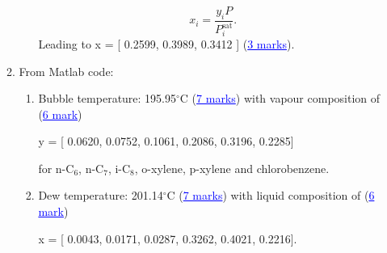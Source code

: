 \documentclass[12pts,a4paper,amsmath,amssymb,floatfix]{article}%
\newcommand{\frc}{\displaystyle\frac}
\newcommand{\blue}{\textcolor{blue}}
\begin{document}
\begin{enumerate}[label=\bfseries Problem \arabic*:]
\begin{enumerate}[label=\bfseries Task \arabic*:]
\begin{enumerate}
                      \begin{displaymath}
                         x_{i} = \frc{y_{i}P}{P_{i}^{\text{sat}}}.
                      \end{displaymath}
                      Leading to x = [ 0.2599, 0.3989, 0.3412 ] (\blue{\underline{3 marks}}).    
            \end{enumerate}
%
          \item From Matlab code:
            \begin{enumerate}
               \item Bubble temperature: 195.95$^{\circ}$C (\blue{\underline{7 marks}}) with vapour composition of (\blue{\underline{6 mark}})
                   \begin{center}
                      y = [ 0.0620, 0.0752, 0.1061, 0.2086, 0.3196, 0.2285]
                   \end{center}
                   for n-C$_{6}$, n-C$_{7}$, i-C$_{8}$, o-xylene, p-xylene and chlorobenzene.
               \item Dew temperature: 201.14$^{\circ}$C (\blue{\underline{7 marks}}) with liquid composition of (\blue{\underline{6 mark}})
                   \begin{center}
                      x = [ 0.0043, 0.0171, 0.0287, 0.3262, 0.4021, 0.2216].
                   \end{center}
            \end{enumerate}
%
      \end{enumerate} 
%
\end{enumerate}
\end{document}
